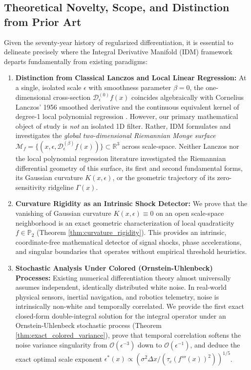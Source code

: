 \documentclass[11pt,a4paper]{article}
\theoremstyle{definition}
\begin{document}
\subsection{Theoretical Novelty, Scope, and Distinction from Prior Art}
\label{sec:novelty_boundary}
Given the seventy-year history of regularized differentiation, it is essential to delineate precisely where the Integral Derivative Manifold (IDM) framework departs fundamentally from existing paradigms:
\begin{enumerate}
    \item \textbf{Distinction from Classical Lanczos and Local Linear Regression:}
    At a single, isolated scale $\epsilon$ with smoothness parameter $\beta = 0$, the one-dimensional cross-section $\mathcal{D}_\epsilon^{(0)} f(x)$ coincides algebraically with Cornelius Lanczos' 1956 smoothed derivative \cite{lanczos1956} and the continuous equivalent kernel of degree-1 local polynomial regression \cite{fan1996, muller1984}. However, our primary mathematical object of study is \emph{not} an isolated 1D filter. Rather, IDM formulates and investigates the \emph{global two-dimensional Riemannian Monge surface} $\mathcal{M}_f = \{(x, \epsilon, \mathcal{D}_\epsilon^{(\beta)} f(x))\} \subset \mathbb{R}^3$ across scale-space. Neither Lanczos nor the local polynomial regression literature investigated the Riemannian differential geometry of this surface, its first and second fundamental forms, its Gaussian curvature $K(x, \epsilon)$, or the geometric trajectory of its zero-sensitivity ridgeline $\Gamma(x)$.
    \item \textbf{Curvature Rigidity as an Intrinsic Shock Detector:}
    We prove that the vanishing of Gaussian curvature $K(x, \epsilon) \equiv 0$ on an open scale-space neighborhood is an exact geometric characterization of local quadraticity $f \in \mathbb{P}_2$ (Theorem \ref{thm:curvature_rigidity}). This provides an intrinsic, coordinate-free mathematical detector of signal shocks, phase accelerations, and singular boundaries that operates without empirical threshold heuristics.
    \item \textbf{Stochastic Analysis Under Colored (Ornstein-Uhlenbeck) Processes:}
    Existing numerical differentiation theory almost universally assumes independent, identically distributed white noise. In real-world physical sensors, inertial navigation, and robotics telemetry, noise is intrinsically non-white and temporally correlated. We provide the first exact closed-form double-integral solution for the integral operator under an Ornstein-Uhlenbeck stochastic process (Theorem \ref{thm:exact_colored_variance}), prove that temporal correlation softens the noise variance singularity from $\mathcal{O}(\epsilon^{-3})$ down to $\mathcal{O}(\epsilon^{-1})$, and deduce the exact optimal scale exponent $\epsilon^*(x) \propto (\sigma^2 \Delta x / (\tau_c (f'''(x))^2))^{1/5}$.

\end{enumerate}
\end{document}
